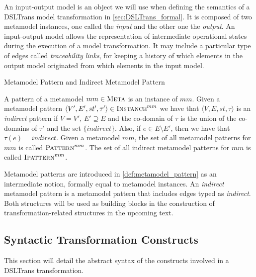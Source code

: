 An input-output model is an object we will use when defining the semantics of a DSLTrans model transformation in \cref{sec:DSLTrans_formal}. It is composed of two metamodel instances, one called the \emph{input} and the other one the \emph{output}. An input-output model allows the representation of intermediate operational states during the execution of a model transformation. It may include a particular type of edges called \emph{traceability links}, for keeping a history of which elements in the output model originated from which elements in the input model.

\begin{definition}{Metamodel Pattern and Indirect Metamodel Pattern\\}
\label{def:metamodel_pattern} 

A pattern of a metamodel $mm\in \textsc{Meta}$ is an instance of $mm$. Given a metamodel pattern $\langle V',E',st',\tau'\rangle\in \textsc{Instance}^{mm}$ we have that $\langle V,E,st,\tau\rangle$ is an \emph{indirect} pattern if $V=V'$, $E'\supseteq E$ and the co-domain of $\tau$ is the union of the co-domains of $\tau'$ and the set $\{indirect\}$. Also, if $e\in E\setminus E'$, then we have that $\tau(e)=indirect$. Given a metamodel $mm$, the set of all metamodel patterns for $mm$ is called $\textsc{Pattern}^{mm}$. The set of all indirect metamodel patterns for $mm$ is called $\textsc{Ipattern}^{mm}$.
\end{definition}


Metamodel patterns are introduced in \cref{def:metamodel_pattern} as an intermediate notion, formally equal to metamodel instances. An \emph{indirect} metamodel pattern is a metamodel pattern that includes edges typed as \emph{indirect}. Both structures will be used as building blocks in the construction of transformation-related structures in the upcoming text.


\subsection{Syntactic Transformation Constructs}
\label{sec:DSLTrans_syntax}

This section will detail the abstract syntax of the constructs involved in a DSLTrans transformation.

